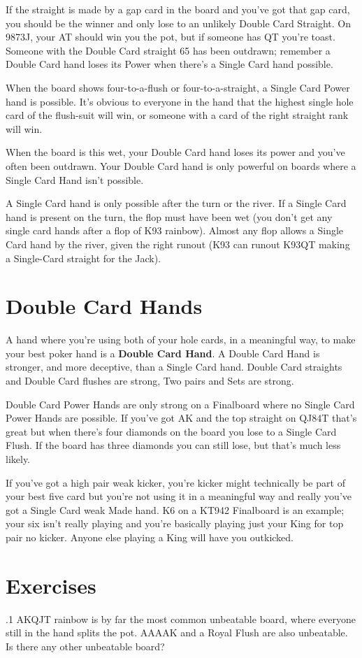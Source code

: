 If the straight is made by a gap card in the board and you've got that
gap card, you should be the winner and only lose to an unlikely Double
Card Straight. On 9873J, your AT should win you the pot, but if
someone has QT you're toast. Someone with the Double Card straight 65
has been outdrawn; remember a Double Card hand loses its Power when
there's a Single Card hand possible.

When the board shows four-to-a-flush or four-to-a-straight, a Single
Card Power hand is possible. It's obvious to everyone in the hand that
the highest single hole card of the flush-suit will win, or someone
with a card of the right straight rank will win.

When the board is this wet, your Double Card hand loses its power and
you've often been outdrawn. Your Double Card hand is only powerful on
boards where a Single Card Hand isn't possible.

A Single Card hand is only possible after the turn or the river. If a
Single Card hand is present on the turn, the flop must have been wet
(you don't get any single card hands after a flop of K93
rainbow). Almost any flop allows a Single Card hand by the river,
given the right runout (K93 can runout K93QT making a Single-Card
straight for the Jack).

\section{Double Card Hands}

A hand where you're using both of your hole cards, in a meaningful
way, to make your best poker hand is a \textbf{Double Card
Hand}. A Double Card Hand is stronger, and more deceptive, than a
Single Card hand. Double Card straights and Double Card flushes are
strong, Two pairs and Sets are strong.

Double Card Power Hands are only strong on a Finalboard where no
Single Card Power Hands are possible. If you've got AK and the top
straight on QJ84T that's great but when there's four diamonds on the
board you lose to a Single Card Flush. If the board has three diamonds
you can still lose, but that's much less likely.

If you've got a high pair weak kicker, you're kicker might technically
be part of your best five card but you're not using it in a meaningful
way and really you've got a Single Card weak Made hand. K6 on a KT942
Finalboard is an example; your six isn't really playing and you're
basically playing just your King for top pair no kicker. Anyone else
playing a King will have you outkicked.

\section{Exercises}

.1 AKQJT rainbow is by far the most common unbeatable
board, where everyone still in the hand splits the pot. AAAAK and a
Royal Flush are also unbeatable. Is there any other unbeatable board?
